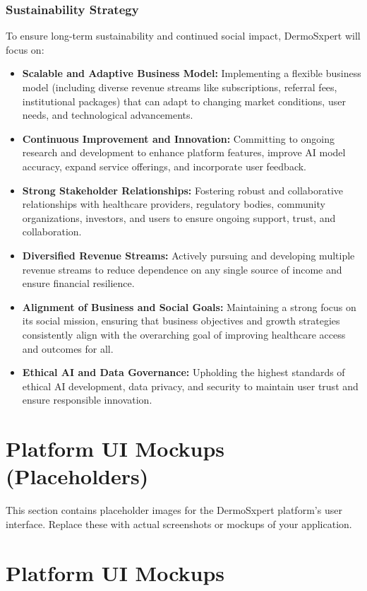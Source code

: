 \subsection{Sustainability Strategy}
To ensure long-term sustainability and continued social impact, DermoSxpert will focus on:
\begin{itemize}
  \item \textbf{Scalable and Adaptive Business Model:} Implementing a flexible business model (including diverse revenue streams like subscriptions, referral fees, institutional packages) that can adapt to changing market conditions, user needs, and technological advancements.
  \item \textbf{Continuous Improvement and Innovation:} Committing to ongoing research and development to enhance platform features, improve AI model accuracy, expand service offerings, and incorporate user feedback.
  \item \textbf{Strong Stakeholder Relationships:} Fostering robust and collaborative relationships with healthcare providers, regulatory bodies, community organizations, investors, and users to ensure ongoing support, trust, and collaboration.
  \item \textbf{Diversified Revenue Streams:} Actively pursuing and developing multiple revenue streams to reduce dependence on any single source of income and ensure financial resilience.
  \item \textbf{Alignment of Business and Social Goals:} Maintaining a strong focus on its social mission, ensuring that business objectives and growth strategies consistently align with the overarching goal of improving healthcare access and outcomes for all.
  \item \textbf{Ethical AI and Data Governance:} Upholding the highest standards of ethical AI development, data privacy, and security to maintain user trust and ensure responsible innovation.
\end{itemize}

\appendix
\chapter{Platform UI Mockups (Placeholders)}

This section contains placeholder images for the DermoSxpert platform's user interface. Replace these with actual screenshots or mockups of your application.
\chapter{Platform UI Mockups}

